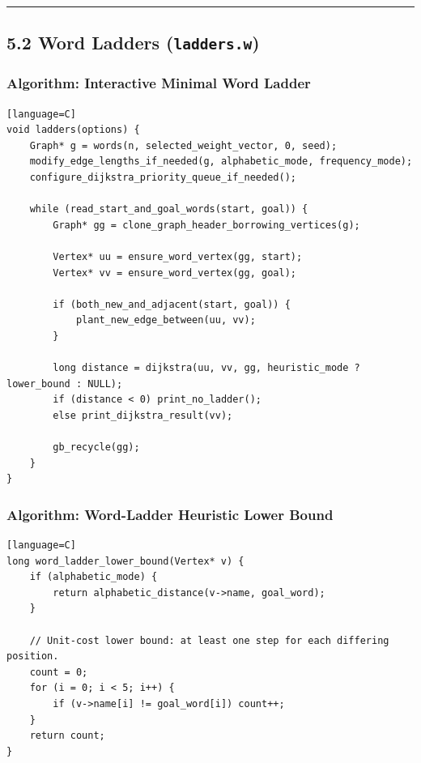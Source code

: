 \documentclass[11pt]{article}
\begin{document}
\begin{center}\rule{0.5\linewidth}{0.5pt}\end{center}

\subsection{\texorpdfstring{5.2 Word Ladders (\texttt{ladders.w})}{5.2 Word Ladders (ladders.w)}}\label{word-ladders-ladders.w}

\subsubsection{Algorithm: Interactive Minimal Word Ladder}\label{algorithm-interactive-minimal-word-ladder}

\begin{verbatim}[language=C]
void ladders(options) {
    Graph* g = words(n, selected_weight_vector, 0, seed);
    modify_edge_lengths_if_needed(g, alphabetic_mode, frequency_mode);
    configure_dijkstra_priority_queue_if_needed();

    while (read_start_and_goal_words(start, goal)) {
        Graph* gg = clone_graph_header_borrowing_vertices(g);

        Vertex* uu = ensure_word_vertex(gg, start);
        Vertex* vv = ensure_word_vertex(gg, goal);

        if (both_new_and_adjacent(start, goal)) {
            plant_new_edge_between(uu, vv);
        }

        long distance = dijkstra(uu, vv, gg, heuristic_mode ? lower_bound : NULL);
        if (distance < 0) print_no_ladder();
        else print_dijkstra_result(vv);

        gb_recycle(gg);
    }
}
\end{verbatim}

\subsubsection{Algorithm: Word-Ladder Heuristic Lower Bound}\label{algorithm-word-ladder-heuristic-lower-bound}

\begin{verbatim}[language=C]
long word_ladder_lower_bound(Vertex* v) {
    if (alphabetic_mode) {
        return alphabetic_distance(v->name, goal_word);
    }

    // Unit-cost lower bound: at least one step for each differing position.
    count = 0;
    for (i = 0; i < 5; i++) {
        if (v->name[i] != goal_word[i]) count++;
    }
    return count;
}
\end{verbatim}
\end{document}
